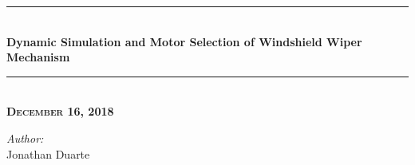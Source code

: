 \begin{titlepage}

\newcommand{\HRule}{\rule{\linewidth}{0.5mm}} %

\center %
 




\HRule \\[0.4cm]
{ \huge \bfseries Dynamic Simulation and Motor Selection of Windshield Wiper Mechanism}\\[0.4cm] %
\HRule \\[1.5cm]

\textsc{\bf {\large December 16, 2018}} \\
	   \vspace{0.8in}
	   

\emph{Author:}\\
Jonathan Duarte \\ %
~


\end{titlepage}
